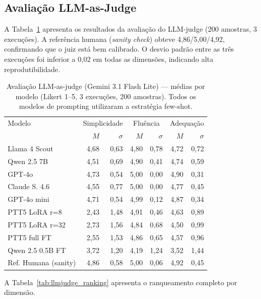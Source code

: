 \documentclass[a4paper, twocolumn, 11pt, twoside]{article}
\begin{document}
\subsection{Avaliação LLM-as-Judge}

A Tabela~\ref{tab:llmjudge} apresenta os resultados da avaliação do
LLM-judge (200 amostras, 3 execuções). A referência humana
(\textit{sanity check}) obteve 4,86/5,00/4,92, confirmando que o juiz
está bem calibrado.
O desvio padrão entre as três execuções foi inferior a 0,02 em
todas as dimensões, indicando alta reprodutibilidade.

\begin{table}[htbp]
\centering
\caption{Avaliação LLM-as-judge (Gemini 3.1 Flash Lite) ---
         médias por modelo (Likert 1--5, 3 execuções, 200 amostras).
         Todos os modelos de prompting utilizaram a estratégia
         few-shot.}
\label{tab:llmjudge}
\footnotesize
\setlength{\tabcolsep}{3pt}
\begin{tabular}{l r r r r r r}
\toprule
Modelo & \multicolumn{2}{c}{Simplicidade}
       & \multicolumn{2}{c}{Fluência}
       & \multicolumn{2}{c}{Adequação} \\
       & $M$ & $\sigma$ & $M$ & $\sigma$ & $M$ & $\sigma$ \\
\midrule
Llama 4 Scout         & 4,68 & 0,63 & 4,80 & 0,78 & 4,72 & 0,72 \\
Qwen 2.5 7B           & 4,51 & 0,69 & 4,90 & 0,41 & 4,74 & 0,59 \\
GPT-4o                & 4,73 & 0,54 & 5,00 & 0,00 & 4,90 & 0,31 \\
Claude S. 4.6         & 4,55 & 0,77 & 5,00 & 0,00 & 4,77 & 0,45 \\
GPT-4o mini           & 4,71 & 0,54 & 4,99 & 0,12 & 4,87 & 0,34 \\
PTT5 LoRA r=8         & 2,43 & 1,48 & 4,91 & 0,46 & 4,63 & 0,89 \\
PTT5 LoRA r=32        & 2,73 & 1,56 & 4,84 & 0,68 & 4,50 & 0,99 \\
PTT5 full FT          & 2,55 & 1,53 & 4,86 & 0,65 & 4,57 & 0,96 \\
Qwen 2.5 0.5B FT      & 3,72 & 1,20 & 4,19 & 1,24 & 3,52 & 1,44 \\
\midrule
Ref. Humana (sanity)  & 4,86 & 0,58 & 5,00 & 0,06 & 4,92 & 0,45 \\
\bottomrule
\end{tabular}
\end{table}

A Tabela~\ref{tab:llmjudge_ranking} apresenta o
ranqueamento completo por dimensão.
\end{document}
